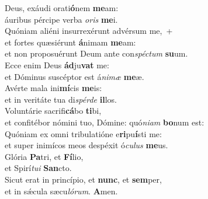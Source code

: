 \evenverse Deus, exáudi orati\textbf{ó}nem \textbf{me}am:~\*\\
\evenverse áuribus pércipe verba \textit{o}\textit{ris} \textbf{me}i.\\
\oddverse Quóniam aliéni insurrexérunt advérsum me,~+\\
\oddverse  et fortes quæsiérunt \textbf{á}nimam \textbf{me}am:~\*\\
\oddverse et non proposuérunt Deum ante con\textit{spé}\textit{ctum} \textbf{su}um.\\
\evenverse Ecce enim Deus \textbf{ád}ju\textbf{vat} me:~\*\\
\evenverse et Dóminus suscéptor est á\textit{ni}\textit{mæ} \textbf{me}æ.\\
\oddverse Avérte mala ini\textbf{mí}cis \textbf{me}is:~\*\\
\oddverse et in veritáte tua di\textit{spér}\textit{de} \textbf{il}los.\\
\evenverse Voluntárie sacrifi\textbf{cá}bo \textbf{ti}bi,~\*\\
\evenverse et confitébor nómini tuo, Dómine: quó\textit{ni}\textit{am} \textbf{bo}num est:\\
\oddverse Quóniam ex omni tribulatióne e\textbf{ri}pu\textbf{í}sti me:~\*\\
\oddverse et super inimícos meos despéxit ó\textit{cu}\textit{lus} \textbf{me}us.\\
\evenverse Glória \textbf{Pa}tri, et \textbf{Fí}lio,~\*\\
\evenverse et Spirí\textit{tu}\textit{i} \textbf{San}cto.\\
\oddverse Sicut erat in princípio, et \textbf{nunc}, et \textbf{sem}per,~\*\\
\oddverse et in sǽcula sæcu\textit{ló}\textit{rum}. \textbf{A}men.\\
